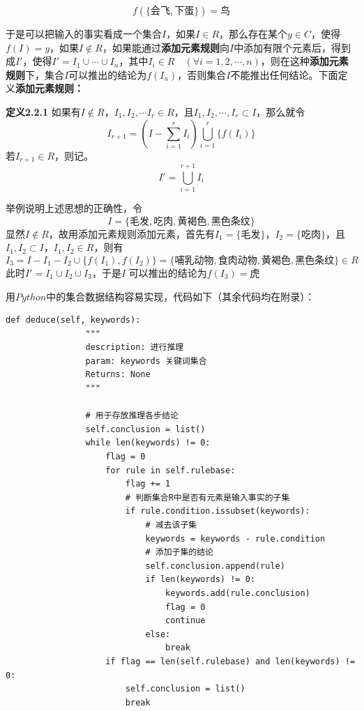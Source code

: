 \documentclass[a4paper]{article}   %
\begin{document}
 	\begin{equation*}
 		f(\{\text{会飞}, \text{下蛋}\}) = \text{鸟}
 	\end{equation*} \par
 	于是可以把输入的事实看成一个集合$ I $，如果$ I \in R $，那么存在某个$ y \in C $，使得$ f(I) = y $，如果$ I \notin R $，如果能通过\textbf{添加元素规则}向$ I $中添加有限个元素后，得到成$ I' $，使得$ I'=I_1 \cup \cdots \cup I_n $，其中$ I_i \in R \quad (\forall i = 1, 2, \cdots, n) $，则在这种\textbf{添加元素规则}下，集合$ I $可以推出的结论为$ f(I_n) $，否则集合$ I $不能推出任何结论。下面定义\textbf{添加元素规则：} \par 
 	\textbf{定义2.2.1} 如果有$ I \notin R $，$ I_1, I_2, \cdots I_r \in R $，且$ I_1, I_2, \cdots, I_r \subset I $，那么就令
 	\begin{equation*}
 		I_{r+1} = \left(I - \sum\limits_{i=1}^{r}I_i\right) \bigcup\limits_{i=1}^{r} \{f(I_i)\}
 	\end{equation*}
 	若$ I_{r+1} \in R $，则记。
 	\begin{equation*}
 		I' = \bigcup\limits_{i=1}^{r+1} I_i
 	\end{equation*}
 	\par 
 	举例说明上述思想的正确性，令
 	\begin{equation*}
 		I = \{\text{毛发}, \text{吃肉}, \text{黄褐色}, \text{黑色条纹}\}
 	\end{equation*}
 	显然$ I \notin R $，故用添加元素规则添加元素，首先有$ I_1 = \{\text{毛发}\} $，$ I_2 = \{\text{吃肉}\} $，且$ I_1, I_2 \subset I $，$ I_1, I_2 \in R $，则有
 	\begin{equation*}
 		I_3 = I - I_1 - I_2 \cup \{f(I_1), f(I_2)\} = \{\text{哺乳动物}, \text{食肉动物}, \text{黄褐色}, \text{黑色条纹}\} \in R
 	\end{equation*}
 	此时$ I' = I_1 \cup I_2 \cup I_3 $，于是$ I $ 可以推出的结论为$ f(I_3) = \text{虎} $ \par 
 	用$ Python $中的集合数据结构容易实现，代码如下（{\color{blue}其余代码均在附录}）：\par
 	\begin{lstlisting}[style=Python]
 		    def deduce(self, keywords):
 		        """
 		        description: 进行推理
 		        param: keywords 关键词集合
 		        Returns: None
 		        """
 		        
 		        # 用于存放推理各步结论
 		        self.conclusion = list()
 		        while len(keywords) != 0:
 		            flag = 0
 		            for rule in self.rulebase:
 		                flag += 1
 		                # 判断集合R中是否有元素是输入事实的子集
 		                if rule.condition.issubset(keywords):
 		                    # 减去该子集
 		                    keywords = keywords - rule.condition
 		                    # 添加子集的结论
 		                    self.conclusion.append(rule)
 		                    if len(keywords) != 0:
 		                        keywords.add(rule.conclusion)
 		                        flag = 0
 		                        continue
 		                    else:
 		                        break
 		            if flag == len(self.rulebase) and len(keywords) != 0:
 		                self.conclusion = list()
 		                break
 	\end{lstlisting} \par 
\end{document}
